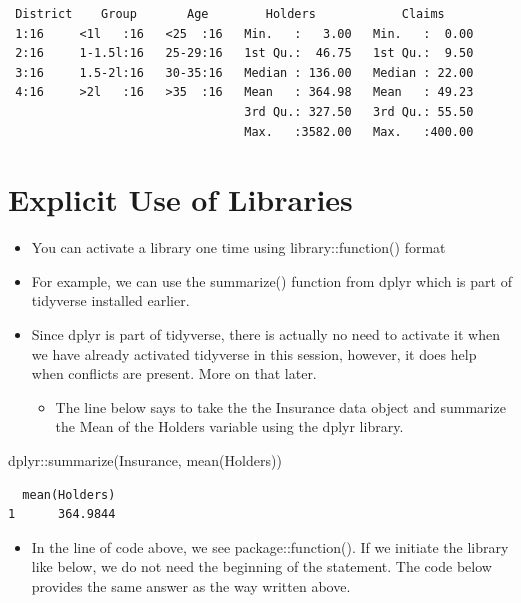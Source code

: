 \documentclass[
  letterpaper,
  DIV=11,
  numbers=noendperiod]{scrreprt}
\newenvironment{Shaded}{\begin{snugshade}}{\end{snugshade}}
\newcommand{\FunctionTok}[1]{\textcolor[rgb]{0.28,0.35,0.67}{#1}}
\newcommand{\NormalTok}[1]{\textcolor[rgb]{0.00,0.23,0.31}{#1}}
\newcommand{\SpecialCharTok}[1]{\textcolor[rgb]{0.37,0.37,0.37}{#1}}
\providecommand{\tightlist}{%
  \setlength{\itemsep}{0pt}\setlength{\parskip}{0pt}}\usepackage{longtable,booktabs,array}
\begin{document}
\begin{verbatim}
 District    Group       Age        Holders            Claims      
 1:16     <1l   :16   <25  :16   Min.   :   3.00   Min.   :  0.00  
 2:16     1-1.5l:16   25-29:16   1st Qu.:  46.75   1st Qu.:  9.50  
 3:16     1.5-2l:16   30-35:16   Median : 136.00   Median : 22.00  
 4:16     >2l   :16   >35  :16   Mean   : 364.98   Mean   : 49.23  
                                 3rd Qu.: 327.50   3rd Qu.: 55.50  
                                 Max.   :3582.00   Max.   :400.00  
\end{verbatim}


\chapter{Explicit Use of Libraries}\label{explicit-use-of-libraries}

\begin{itemize}
\item
  You can activate a library one time using library::function() format
\item
  For example, we can use the summarize() function from dplyr which is
  part of tidyverse installed earlier.
\item
  Since dplyr is part of tidyverse, there is actually no need to
  activate it when we have already activated tidyverse in this session,
  however, it does help when conflicts are present. More on that later.

  \begin{itemize}
  \tightlist
  \item
    The line below says to take the the Insurance data object and
    summarize the Mean of the Holders variable using the dplyr library.
  \end{itemize}
\end{itemize}

\begin{Shaded}
\begin{Highlighting}[]
\NormalTok{dplyr}\SpecialCharTok{::}\FunctionTok{summarize}\NormalTok{(Insurance, }\FunctionTok{mean}\NormalTok{(Holders))}
\end{Highlighting}
\end{Shaded}

\begin{verbatim}
  mean(Holders)
1      364.9844
\end{verbatim}

\begin{itemize}
\tightlist
\item
  In the line of code above, we see package::function(). If we initiate
  the library like below, we do not need the beginning of the statement.
  The code below provides the same answer as the way written above.
\end{itemize}
\end{document}

